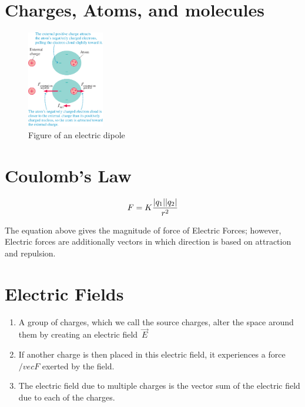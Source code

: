 \documentclass{report}
\begin{document}
\section{Charges, Atoms, and molecules}
\begin{figure}
  \includegraphics[width=0.3\textwidth]{figures/dipole.jpg}
  \caption{Figure of an electric dipole}
  \label{fig:dipole}
\end{figure}

\section{Coulomb's Law}
\begin{equation}
  F = K \frac{\lvert q_1\rvert \lvert q_2\rvert}{r^2}
  \label{eq:Coulomb's Law}
\end{equation}

The equation above gives the magnitude of force of Electric Forces; however, Electric forces are additionally vectors in which direction is based on attraction and repulsion.

\section{Electric Fields} 
\begin{enumerate}
  \item A group of charges, which we call the source charges, alter the space around them by creating an electric field $\vec{E}$
  \item If another charge is then placed in this electric field, it experiences a force $/vec{F}$ exerted by the field.
  \item The electric field due to multiple charges is the vector sum of the electric field due to each of the charges.   

\end{enumerate}
\end{document}
